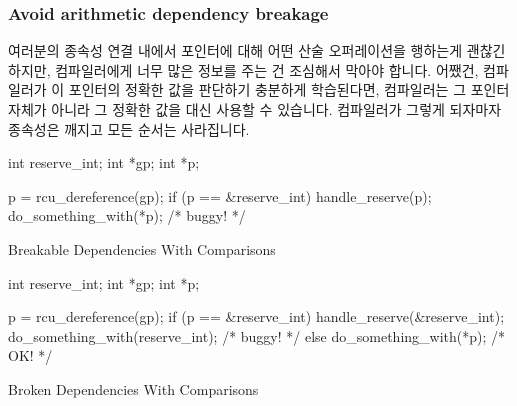 \subsubsection{Avoid arithmetic dependency breakage}
여러분의 종속성 연결 내에서 포인터에 대해 어떤 산술 오퍼레이션을 행하는게
괜찮긴 하지만, 컴파일러에게 너무 많은 정보를 주는 건 조심해서 막아야 합니다.
어쨌건, 컴파일러가 이 포인터의 정확한 값을 판단하기 충분하게 학습된다면,
컴파일러는 그 포인터 자체가 아니라 그 정확한 값을 대신 사용할 수 있습니다.
컴파일러가 그렇게 되자마자 종속성은 깨지고 모든 순서는 사라집니다.

\begin{listing}[tbp]
\begin{fcvlabel}
\begin{VerbatimL}[commandchars=\\\[\]]
int reserve_int;
int *gp;
int *p;

p = rcu_dereference(gp);
if (p == &reserve_int)		\lnlbl[cmp]
	handle_reserve(p);	\lnlbl[handle]
do_something_with(*p); /* buggy! */
\end{VerbatimL}
\end{fcvlabel}
\caption{Breakable Dependencies With Comparisons}
\label{lst:memorder:Breakable Dependencies With Comparisons}
\end{listing}

\begin{listing}[tbp]
\begin{fcvlabel}
\begin{VerbatimL}[commandchars=\\\[\]]
int reserve_int;
int *gp;
int *p;

p = rcu_dereference(gp);	\lnlbl[deref1]
if (p == &reserve_int) {
	handle_reserve(&reserve_int);
	do_something_with(reserve_int); /* buggy! */ \lnlbl[deref2]
} else {
	do_something_with(*p); /* OK! */
}
\end{VerbatimL}
\end{fcvlabel}
\caption{Broken Dependencies With Comparisons}
\label{lst:memorder:Broken Dependencies With Comparisons}
\end{listing}

